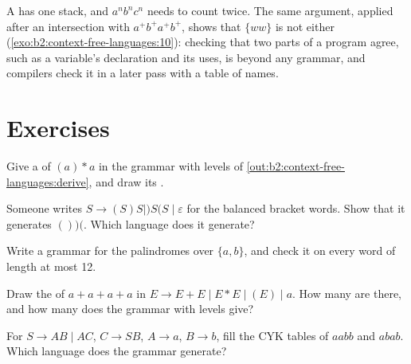 A  has one stack, and $a^nb^nc^n$ needs to count twice. The same argument, applied after an
intersection with $a^+b^+a^+b^+$, shows that $\{ww\}$ is not  either (\cref{exo:b2:context-free-languages:10}):
checking that two parts of a program agree, such as a variable's declaration and its uses, is beyond any grammar, and
compilers check it in a later pass with a table of names.

\section{Exercises}\label{sec:b2:context-free-languages:exercises}

\begin{exercise}[$\star$]\label{exo:b2:context-free-languages:1}
Give a  of $(a) * a$ in the grammar with levels of \cref{out:b2:context-free-languages:derive}, and
draw its .
\end{exercise}

\begin{exercise}[$\star$]\label{exo:b2:context-free-languages:2}
Someone writes $S \to (S)S \mid )S(S \mid \varepsilon$ for the balanced bracket words. Show that it generates $())($.
Which language does it generate?
\end{exercise}

\begin{exercise}[$\star$]\label{exo:b2:context-free-languages:3}
Write a grammar for the palindromes over $\{a, b\}$, and check it on every word of length at most 12.
\end{exercise}

\begin{exercise}[$\star$]\label{exo:b2:context-free-languages:4}
Draw the  of $a + a + a + a$ in $E \to E + E \mid E * E \mid (E) \mid a$. How many are there, and how many
does the grammar with levels give?
\end{exercise}

\begin{exercise}[$\star\star$]\label{exo:b2:context-free-languages:5}
For $S \to AB \mid AC$, $C \to SB$, $A \to a$, $B \to b$, fill the CYK tables of $aabb$ and $abab$. Which language does
the grammar generate?
\end{exercise}

